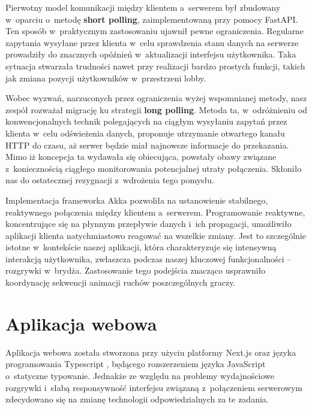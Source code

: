 Pierwotny model komunikacji między klientem a~serwerem
był zbudowany w~oparciu o~metodę \textbf{short polling},
zaimplementowaną przy pomocy FastAPI. Ten sposób
w~praktycznym zastosowaniu ujawnił pewne ograniczenia.
Regularne zapytania wysyłane przez klienta w~celu
sprawdzenia stanu danych na serwerze prowadziły do
znacznych opóźnień w~aktualizacji interfejsu
użytkownika. Taka sytuacja stwarzała trudności nawet
przy realizacji bardzo prostych funkcji, takich jak
zmiana pozycji użytkowników w~przestrzeni lobby.

Wobec wyzwań, narzuconych przez ograniczenia wyżej wspomnianej metody, nasz
zespół rozważał migrację ku strategii \textbf{long polling}. Metoda ta,
w~odróżnieniu od konwencjonalnych technik polegających na ciągłym
wysyłaniu zapytań przez klienta w~celu odświeżenia danych, proponuje
utrzymanie otwartego kanału HTTP do czasu, aż serwer będzie miał
najnowsze informacje do przekazania. Mimo iż koncepcja ta wydawała się
obiecująca, powstały obawy związane z~koniecznością ciągłego monitorowania
potencjalnej utraty połączenia. Skłoniło nas do ostatecznej rezygnacji
z~wdrożenia tego pomysłu.

Implementacja frameworka Akka \cite{Akka} pozwoliła na ustanowienie stabilnego,
reaktywnego połączenia między klientem a~serwerem. Programowanie
reaktywne, koncentrujące się na płynnym przepływie danych i~ich propagacji,
umożliwiło aplikacji klienta natychmiastowo reagować na wszelkie zmiany. Jest
to szczególnie istotne w~kontekście naszej aplikacji, która charakteryzuje
się intensywną interakcją użytkownika, zwłaszcza podczas naszej kluczowej
funkcjonalności -- rozgrywki w~brydża. Zastosowanie tego podejścia
znacząco usprawniło koordynację sekwencji animacji ruchów poszczególnych
graczy.


\section{Aplikacja webowa}
Aplikacja webowa została stworzona przy użyciu platformy Next.js
\cite{NextJS} oraz języka programowania Typescript \cite{Typescript},
będącego rozszerzeniem języka JavaScript o~statyczne typowanie.
Jednakże ze względu na problemy wydajnościowe rozgrywki
i~słabą responsywność interfejsu związaną z~połączeniem serwerowym
zdecydowano się na zmianę technologii odpowiedzialnych za te zadania.

